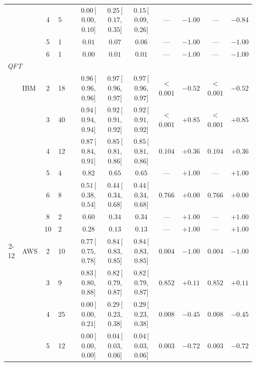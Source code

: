 \documentclass[10pt,conference]{IEEEtran}
\begin{document}
\begin{table}[ht!]
\begin{tabular}{cl cl r ccc cc cc}
   & & 4 & 5 & & $0.00$\,{\scriptsize[$0.00$,$0.10$]} & $0.25$\,{\scriptsize[$0.17$,$0.35$]} & $0.15$\,{\scriptsize[$0.09$,$0.26$]} & --- & $-1.00$ & --- & $-0.84$ \\
   & & 5 & 1 & & $0.01$ & $0.07$ & $0.06$ & --- & $-1.00$ & --- & $-1.00$ \\
   & & 6 & 1 & & $0.00$ & $0.01$ & $0.01$ & --- & $-1.00$ & --- & $-1.00$ \\
  \hline
  \multicolumn{12}{l}{\textit{QFT}} \\
  \hline
   & IBM & 2 & 18 & & $0.96$\,{\scriptsize[$0.96$,$0.96$]} & $0.97$\,{\scriptsize[$0.96$,$0.97$]} & $0.97$\,{\scriptsize[$0.96$,$0.97$]} & $<$0.001 & $-0.52$ & $<$0.001 & $-0.52$ \\
   & & 3 & 40 & & $0.94$\,{\scriptsize[$0.94$,$0.94$]} & $0.92$\,{\scriptsize[$0.91$,$0.92$]} & $0.92$\,{\scriptsize[$0.91$,$0.92$]} & $<$0.001 & $+0.85$ & $<$0.001 & $+0.85$ \\
   & & 4 & 12 & & $0.87$\,{\scriptsize[$0.84$,$0.91$]} & $0.85$\,{\scriptsize[$0.81$,$0.86$]} & $0.85$\,{\scriptsize[$0.81$,$0.86$]} & $0.104$ & $+0.36$ & $0.104$ & $+0.36$ \\
   & & 5 & 4 & & $0.82$ & $0.65$ & $0.65$ & --- & $+1.00$ & --- & $+1.00$ \\
   & & 6 & 8 & & $0.51$\,{\scriptsize[$0.38$,$0.54$]} & $0.44$\,{\scriptsize[$0.34$,$0.68$]} & $0.44$\,{\scriptsize[$0.34$,$0.68$]} & $0.766$ & $+0.00$ & $0.766$ & $+0.00$ \\
   & & 8 & 2 & & $0.60$ & $0.34$ & $0.34$ & --- & $+1.00$ & --- & $+1.00$ \\
   & & 10 & 2 & & $0.28$ & $0.13$ & $0.13$ & --- & $+1.00$ & --- & $+1.00$ \\
  \cline{2-12}
   & AWS & 2 & 10 & & $0.77$\,{\scriptsize[$0.75$,$0.78$]} & $0.84$\,{\scriptsize[$0.83$,$0.85$]} & $0.84$\,{\scriptsize[$0.83$,$0.85$]} & $0.004$ & $-1.00$ & $0.004$ & $-1.00$ \\
   & & 3 & 9 & & $0.83$\,{\scriptsize[$0.80$,$0.88$]} & $0.82$\,{\scriptsize[$0.79$,$0.87$]} & $0.82$\,{\scriptsize[$0.79$,$0.87$]} & $0.852$ & $+0.11$ & $0.852$ & $+0.11$ \\
   & & 4 & 25 & & $0.00$\,{\scriptsize[$0.00$,$0.21$]} & $0.29$\,{\scriptsize[$0.23$,$0.38$]} & $0.29$\,{\scriptsize[$0.23$,$0.38$]} & $0.008$ & $-0.45$ & $0.008$ & $-0.45$ \\
   & & 5 & 12 & & $0.00$\,{\scriptsize[$0.00$,$0.00$]} & $0.04$\,{\scriptsize[$0.03$,$0.06$]} & $0.04$\,{\scriptsize[$0.03$,$0.06$]} & $0.003$ & $-0.72$ & $0.003$ & $-0.72$ \\
  \hline
  \end{tabular}
  \end{table}
\end{document}
